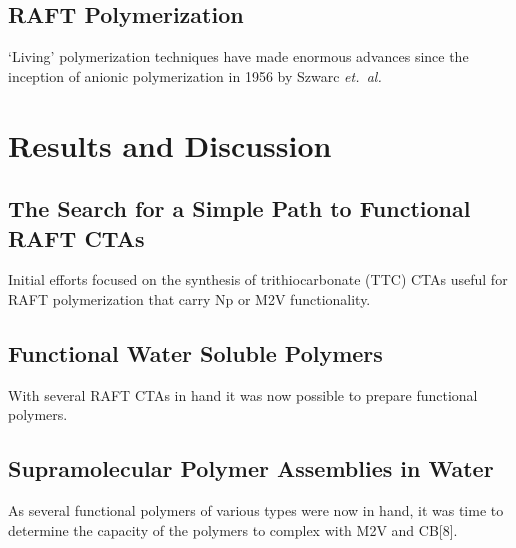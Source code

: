 \documentclass[a4wide,12pt]{report} %
\begin{document}




\section{RAFT Polymerization}

\noindent
`Living' polymerization techniques have made enormous advances since the inception of anionic polymerization in 1956 by Szwarc {\it et.~al.}~\cite{Szwarc:1956p46, Szwarc:1956p55} 




\chapter{Results and Discussion}




\section{The Search for a Simple Path to Functional RAFT CTAs}

\noindent
Initial efforts focused on the synthesis of trithiocarbonate (TTC) CTAs useful for RAFT polymerization that carry Np or M2V functionality.  



\section{Functional Water Soluble Polymers}

With several RAFT CTAs in hand it was now possible to prepare functional polymers.



\section{Supramolecular Polymer Assemblies in Water}


As several functional polymers of various types were now in hand, it was time to determine the capacity of the polymers to complex with M2V and CB[8].
\end{document}
